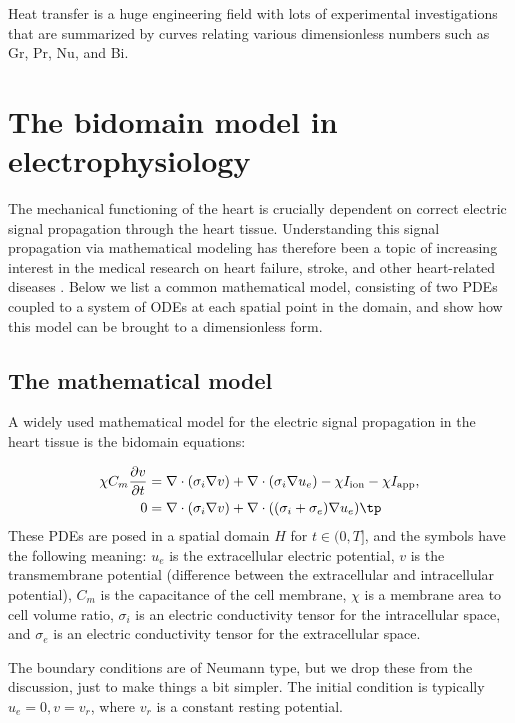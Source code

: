 \documentclass[graybox,envcountchap,sectrefs,final]{svmonodo}
\begin{document}
Heat transfer is a huge engineering
field with lots of experimental investigations
that are summarized by curves relating various dimensionless numbers
such as Gr, Pr, Nu, and Bi.

\section{The bidomain model in electrophysiology}
\label{scale:bidomain}

The mechanical functioning of the heart is crucially dependent on
correct electric signal propagation through the heart tissue.
Understanding this signal propagation via mathematical modeling has
therefore been a topic of increasing interest in the medical research
on heart failure, stroke, and other heart-related diseases
\cite{Sundnes_2006}.  Below we list a common mathematical model,
consisting of two PDEs coupled to a system of ODEs at each spatial
point in the domain, and show how this model can be brought to a
dimensionless form.


\subsection{The mathematical model}


A widely used mathematical model for the electric signal propagation
in the heart tissue is the bidomain equations:

\begin{align}
\chi C_m\frac{\partial v}{\partial t} &=
\nabla\cdot( \sigma_i\nabla v) + \nabla\cdot (\sigma_i\nabla u_e) - \chi I_{\rm{ion}}
- \chi I_{\rm{app}},
\label{scale:bidomain:eqv}\\ 
0 &= \nabla\cdot( \sigma_i\nabla v) + \nabla\cdot ((\sigma_i + \sigma_e)\nabla u_e)\tp
\label{scale:bidomain:equ_e}
\end{align}
These PDEs are posed in a spatial domain $H$ for $t\in (0, T]$, and the symbols have the following meaning:
$u_e$ is the extracellular electric potential,
$v$ is the transmembrane potential (difference between the extracellular
and intracellular potential),
$C_m$ is the capacitance of the cell membrane,
$\chi$ is a membrane area to cell volume ratio,
$\sigma_i$ is an electric conductivity tensor for the intracellular space, and
$\sigma_e$ is an electric conductivity tensor for the extracellular space.

The boundary conditions are of Neumann type, but we drop these from
the discussion, just to make things a bit simpler.  The initial
condition is typically $u_e=0, v = v_r$, where $v_{r}$ is a constant
resting potential.
\end{document}
